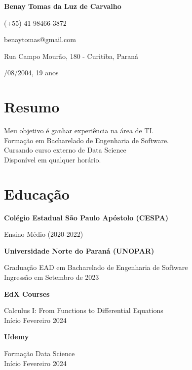 \documentclass[12pt]{extarticle}
\newcommand{\cvsection}[1]{\section*{\rmfamily#1}}
\begin{document}
\begin{center}
    \Huge{
    \rmfamily
    \textbf{Benay Tomas da Luz de Carvalho}}
\end{center}
\vspace{20pt}


\setlength{\parskip}{1pt}
\renewcommand{\arraystretch}{1.25}


\begin{center}

{\large

\noindent (+55) 41 98466-3872

\noindent benaytomas@gmail.com

\noindent Rua Campo Mourão, 180 - Curitiba, Paraná

/08/2004, 19 anos

}

\end{center}

\setlength{\parskip}{3pt}

\cvsection{Resumo}

\indent
{\large

Meu objetivo é ganhar experiência na área de TI.\\
\indent Formação em Bacharelado de Engenharia de Software.\\
\indent Cursando curso externo de Data Science\\
\indent Disponível em qualquer horário.

}

\cvsection{Educação}
\indent 
{\large

\textbf{Colégio Estadual São Paulo Apóstolo (CESPA)}

\hspace{2em}Ensino Médio (2020-2022)

\textbf{Universidade Norte do Paraná (UNOPAR)}

\hspace{2em}Graduação EAD em Bacharelado de Engenharia de Software\\
\indent
\hspace{2em}Ingressão em Setembro de 2023

\textbf{EdX Courses}

\hspace{2em}Calculus I: From Functions to Differential Equations\\
\indent
\hspace{2em}Início Fevereiro 2024

\textbf{Udemy}

\hspace{2em}Formação Data Science\\
\indent
\hspace{2em}Início Fevereiro 2024


}
\end{document}
